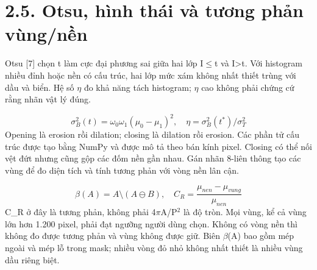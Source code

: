 \documentclass[12pt,a4paper]{extreport}
\begin{document}
\section*{2.5. Otsu,\allowbreak{} hình thái và tương phản vùng/\allowbreak{}nền}
Otsu [7] chọn t làm cực đại phương sai giữa hai lớp I\ensuremath{\leq}t và I>t. Với histogram nhiều đỉnh hoặc nền có cấu trúc,\allowbreak{} hai lớp mức xám không nhất thiết trùng với dầu và biển. Hệ số \ensuremath{\eta} đo khả năng tách histogram; \ensuremath{\eta} cao không phải chứng cứ rằng nhãn vật lý đúng.
\par
\begin{equation}\sigma_B^2(t)=\omega_0\omega_1(\mu_0-\mu_1)^2,\quad \eta=\sigma_B^2(t^*)/\sigma_T^2\tag{2.12}\end{equation}
Opening là erosion rồi dilation; closing là dilation rồi erosion. Các phần tử cấu trúc được tạo bằng NumPy và được mô tả theo bán kính pixel. Closing có thể nối vệt đứt nhưng cũng gộp các đốm nền gần nhau. Gán nhãn 8-liên thông tạo các vùng để đo diện tích và tính tương phản với vòng nền lân cận.
\par
\begin{equation}\beta(A)=A\setminus(A\ominus B),\quad C_R=\frac{\mu_{nen}-\mu_{vung}}{\mu_{nen}}\tag{2.13}\end{equation}
C\_R ở đây là tương phản,\allowbreak{} không phải 4\ensuremath{\pi}A/\allowbreak{}P\ensuremath{{}^2} là độ tròn. Mọi vùng,\allowbreak{} kể cả vùng lớn hơn 1.200 pixel,\allowbreak{} phải đạt ngưỡng người dùng chọn. Không có vòng nền thì không đo được tương phản và vùng không được giữ. Biên \ensuremath{\beta}(A) bao gồm mép ngoài và mép lỗ trong mask; nhiều vòng đỏ nhỏ không nhất thiết là nhiều vùng dầu riêng biệt.
\par
\end{document}
